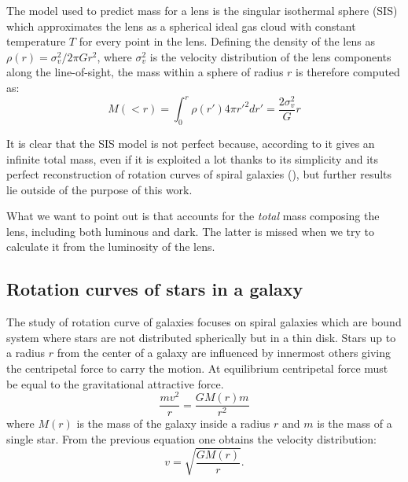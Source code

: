 The model used to predict mass for a lens is the singular isothermal sphere (SIS) \cite{book:971430} which approximates the lens as a spherical ideal gas cloud with constant temperature $T$ for every point in the lens. Defining the density of the lens as $\rho(r)=\sigma_v^2/2\pi G r^2$, where $\sigma_v^2$ is the velocity distribution of the lens components along the line-of-sight, the mass within a sphere of radius $r$ is therefore computed as:
\begin{equation}
M(<r)=\int_0^r{\rho(r')4\pi r'^2 dr'}=\frac{2\sigma_v^2}{G}r
\label{mass}
\end{equation}

It is clear that the SIS model is not perfect because, according to \Eqn{\ref{mass}} it gives an infinite total mass, even if it is exploited a lot thanks to its simplicity and its perfect reconstruction of rotation curves of spiral galaxies (\Sect{\ref{sec:rotcurves}}), but further results lie outside of the purpose of this work.

What we want to point out is that  \Eqn{\ref{mass}} accounts for the \emph{total} mass composing the lens, including both luminous and dark. The latter is missed when we try to calculate it from the luminosity of the lens.
   
\subsection{Rotation curves of stars in a galaxy}
\label{sec:rotcurves}
The study of rotation curve of galaxies focuses on spiral galaxies which are bound system where stars are not distributed spherically but in a thin disk. Stars up to a radius $r$ from the center of a galaxy are influenced by innermost others giving the centripetal force to carry the motion. At equilibrium centripetal force must be equal to the gravitational attractive force.
\begin{equation}
\frac{mv^2}{r}=\frac{GM(r)m}{r^2}
\label{previous}
\end{equation}
where $M(r)$ is the mass of the galaxy inside a radius $r$ and $m$ is the mass of a single star. From the previous equation one obtains the velocity distribution:
\begin{equation}
v=\sqrt{\frac{GM(r)}{r}}.
\end{equation}

